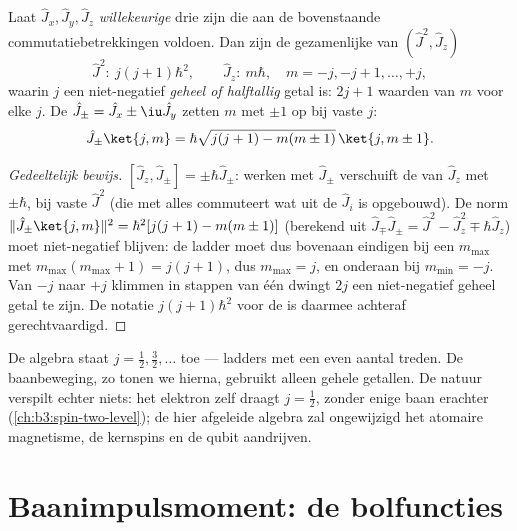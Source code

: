 \begin{theorem}\label{thm:b3:quantum-angular-momentum:spectrum}
Laat $\hat J_x, \hat J_y, \hat J_z$ \emph{willekeurige} drie  zijn die aan de bovenstaande commutatiebetrekkingen voldoen.
Dan zijn de gezamenlijke  van $(\hat J^2, \hat J_z)$
\[
\hat J^2:\ j(j+1)\hbar^2 , \qquad
\hat J_z:\ m\hbar , \quad m = -j, -j+1, \dots, +j ,
\]
waarin $j$ een niet-negatief \emph{geheel of halftallig} getal is: $2j + 1$ waarden van $m$ voor elke $j$. De  $\hat J_\pm = \hat
J_x \pm \iu\hat J_y$ zetten $m$ met $\pm1$ op bij vaste $j$:
\[
\hat J_\pm\ket{j,m} = \hbar\sqrt{j(j+1) - m(m\pm1)}\,\ket{j,m\pm1} .
\]
\end{theorem}

\begin{proof}[Gedeeltelijk bewijs]
$[\hat J_z, \hat J_\pm] = \pm\hbar\hat J_\pm$: werken met $\hat
J_\pm$
verschuift de  van $\hat J_z$ met $\pm\hbar$, bij vaste $\hat J^2$ (die met alles commuteert wat uit de $\hat
J_i$ is opgebouwd). De
norm $\|\hat J_\pm\ket{j,m}\|^2 = \hbar^2[j(j+1) -
m(m\pm1)]$ (berekend
uit $\hat J_\mp\hat J_\pm = \hat J^2 - \hat
J_z^2 \mp \hbar\hat J_z$) moet
niet-negatief blijven: de ladder moet dus bovenaan eindigen bij een
$m_{\max}$ met $m_{\max}(m_{\max}+1) =
j(j+1)$, dus $m_{\max} = j$, en
onderaan bij $m_{\min} = -j$. Van $-j$ naar $+j$ klimmen in stappen van
één dwingt $2j$ een niet-negatief geheel getal te zijn. De notatie
$j(j+1)\hbar^2$ voor de  is daarmee achteraf gerechtvaardigd.
\end{proof}

\begin{remark}\label{rem:b3:quantum-angular-momentum:halfinteger}
De algebra staat $j = \tfrac12, \tfrac32, \dots$ toe --- ladders met een
even aantal treden. De baanbeweging, zo tonen we hierna, gebruikt alleen
gehele getallen. De natuur verspilt echter niets: het elektron zelf draagt
$j = \tfrac12$, zonder enige baan erachter
(\cref{ch:b3:spin-two-level}); de hier afgeleide algebra zal ongewijzigd
het atomaire magnetisme, de kernspins en de qubit aandrijven.
\end{remark}

\section{Baanimpulsmoment: de bolfuncties}

